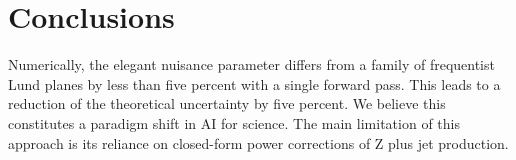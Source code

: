 \section{Conclusions}\label{sec:conclusions}

Numerically, the elegant nuisance parameter differs from a family of
frequentist Lund planes by less than five percent with a single forward
pass. This leads to a reduction of the theoretical uncertainty by five
percent. We believe this constitutes a paradigm shift in AI for science.
The main limitation of this approach is its reliance on closed-form
power corrections of Z plus jet production.

